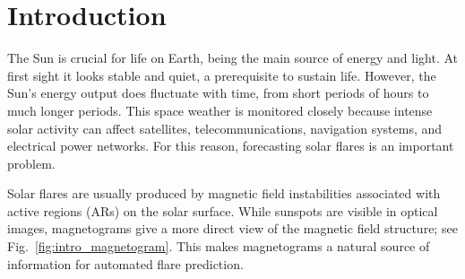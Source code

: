 \documentclass[runningheads]{llncs}
\begin{document}
\begin{abstract}
Solar flare forecasting from magnetogram data has been studied with both classical machine learning and deep learning methods. Here we use the reduced-resolution active-region dataset of Boucheron et al.~\cite{ref_boucheron} to study four input-design choices under a common fine-tuning protocol: image resolution, solar-disk position, temporal cadence, and number of frames. The main metric is the True Skill Statistic (TSS), with the decision threshold selected on the validation set; we also report threshold-free ranking metrics such as AUC. Image experiments use a 2D MViT backbone, while sequence experiments use an MViT model for both $\geq C$ and $\geq M$ flare prediction in the next 24 hours. Full resolution performed best on average, but lower resolutions retained much of the performance. Central longitudes gave higher TSS and AUC than outer longitudes, and central-only training improved central-subset TSS. For 16-frame sequences, the 180-minute cadence gave the best mean TSS and AUC for both tasks. When the temporal span was fixed at 45 hours, shorter 4- or 8-frame sequences remained competitive, although the preferred frame count depended on the task and metric. Overall, temporal span was the clearest temporal driver in our experiments, and several input-efficient configurations retained competitive performance.




\end{abstract}

\section{Introduction}

The Sun is crucial for life on Earth, being the main source of energy and light. At first sight it looks stable and quiet, a prerequisite to sustain life. However, the Sun's energy output does fluctuate with time, from short periods of hours to much longer periods. This space weather is monitored closely because intense solar activity can affect satellites, telecommunications, navigation systems, and electrical power networks. For this reason, forecasting solar flares is an important problem.

Solar flares are usually produced by magnetic field instabilities associated with active regions (ARs) on the solar surface. While sunspots are visible in optical images, magnetograms give a more direct view of the magnetic field structure; see Fig.~\ref{fig:intro_magnetogram}. This makes magnetograms a natural source of information for automated flare prediction.
\end{document}
